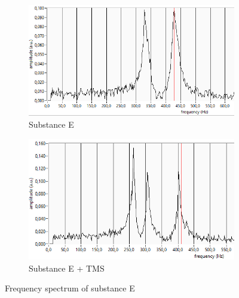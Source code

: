 \begin{figure}[!htbp]
  \centering
  \begin{subfigure}[b]{0.47\textwidth}
    \centering
    \includegraphics[width=\textwidth]{./Latex images/E.png}
    \caption{Substance E}
    \label{fig: E}
  \end{subfigure}
  \hfill
  \begin{subfigure}[b]{0.47\textwidth}
    \centering
    \includegraphics[width=\textwidth]{./Latex images/Ep.png}
    \caption{Substance E + TMS}
    \label{fig: E + TMS}
  \end{subfigure}
  \caption{Frequency spectrum of substance E}
  \label{fig:sample E}
\end{figure}

